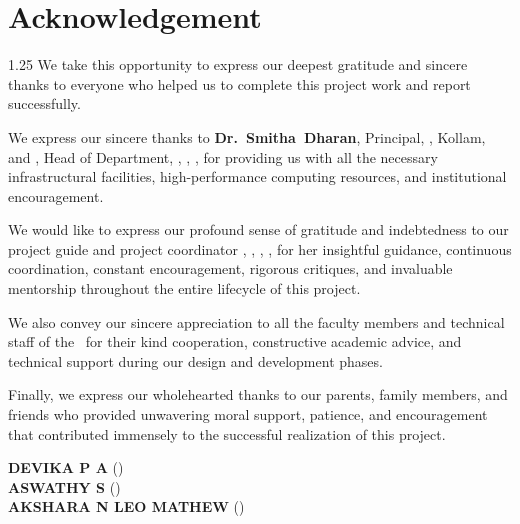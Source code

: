 \chapter*{Acknowledgement}%
%
\vspace{-15pt}

\begin{spacing}{1.25}
\noindent We take this opportunity to express our deepest gratitude and sincere thanks to everyone who helped us to complete this project work and report successfully.

\vspace{6pt}

\noindent We express our sincere thanks to \mbox{\textbf{Dr.~Smitha Dharan}}, Principal, \college, Kollam, and \mbox{\textbf{\hod}}, Head of Department, \dept, \college, \collegeplace, for providing us with all the necessary infrastructural facilities, high-performance computing resources, and institutional encouragement.

\vspace{6pt}

\noindent We would like to express our profound sense of gratitude and indebtedness to our project guide and project coordinator \mbox{\textbf{\guide}}, \guidedes, \dept, \college, for her insightful guidance, continuous coordination, constant encouragement, rigorous critiques, and invaluable mentorship throughout the entire lifecycle of this project.

\vspace{6pt}

\noindent We also convey our sincere appreciation to all the faculty members and technical staff of the \dept\ for their kind cooperation, constructive academic advice, and technical support during our design and development phases.

\vspace{6pt}

\noindent Finally, we express our wholehearted thanks to our parents, family members, and friends who provided unwavering moral support, patience, and encouragement that contributed immensely to the successful realization of this project.

\vspace*{14pt}
\begin{flushright}
	\textbf{DEVIKA P A} (\rollnoA) \\[3pt]
	\textbf{ASWATHY S} (\rollnoB) \\[3pt]
	\textbf{AKSHARA N LEO MATHEW} (\rollnoC)
\end{flushright}
\end{spacing}

\thispagestyle{plain}
